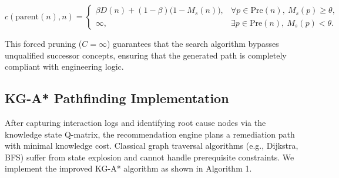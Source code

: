 \documentclass{ieeeaccess}
\newcommand{\Pre}{\mathrm{Pre}}  %
\begin{document}
\begin{equation}
c(\text{parent}(n), n) =
\begin{cases}
\beta D(n) + (1-\beta)\bigl(1 - M_s(n)\bigr), 
    & \forall p \in \Pre(n),\ M_s(p) \ge \theta, \\[6pt]
\infty, 
    & \exists p \in \Pre(n),\ M_s(p) < \theta .
\end{cases}
\label{eq:cost}
\end{equation}

This forced pruning ($C=\infty$) guarantees that the search algorithm bypasses unqualified successor concepts, ensuring that the generated path is completely compliant with engineering logic.

\subsection{KG-A* Pathfinding Implementation}
After capturing interaction logs and identifying root cause nodes via the knowledge state Q-matrix, the recommendation engine plans a remediation path with minimal knowledge cost. Classical graph traversal algorithms (e.g., Dijkstra, BFS) suffer from state explosion and cannot handle prerequisite constraints. We implement the improved KG-A* algorithm as shown in Algorithm 1.
\end{document}
